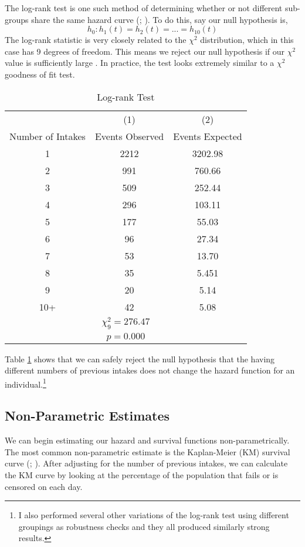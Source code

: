 \documentclass{article}
\begin{document}
The log-rank test is one such method of determining whether or not different sub-groups share the same hazard curve (\cite{mantel}; \cite{peto}). To do this, say our null hypothesis is,
\begin{equation}
    \label{eq3}
    h_0 : h_1 (t) = h_2 (t) = ... = h_{10} (t)
\end{equation}
The log-rank statistic is very closely related to the $\chi ^2$ distribution, which in this case has 9 degrees of freedom. This means we reject our null hypothesis if our $\chi ^2$ value is sufficiently large \parencite{lamorte}. In practice, the test looks extremely similar to a $\chi ^2$ goodness of fit test. 
\begin{table}[t]
    \centering
\begin{tabular}{ccc} \hline
 & (1) & (2) \\
Number of Intakes & Events Observed  & Events Expected  \\ \hline

1 & 2212 & 3202.98 \\
2 & 991 &  760.66  \\
3 & 509 &  252.44 \\
4 &  296 & 103.11  \\
5 & 177 & 55.03 \\
6 & 96 & 27.34  \\
7 &  53&   13.70 \\
8 & 35 & 5.451 \\ 
9 & 20 & 5.14\\
10+ & 42 & 5.08\\ \hline
\multicolumn{5}{c}{$\chi ^2 _9 = 276.47$}\\
\multicolumn{5}{c}{$p = 0.000$}
\end{tabular}
    \caption{Log-rank Test}
    \label{tab2}
\end{table}
Table \ref{tab2} shows that we can safely reject the null hypothesis that the having different numbers of previous intakes does not change the hazard function for an individual.\footnote{I also performed several other variations of the log-rank test using different groupings as robustness checks and they all produced similarly strong results.} 

\subsection{Non-Parametric Estimates}
We can begin estimating our hazard and survival functions non-parametrically. The most common non-parametric estimate is the Kaplan-Meier (KM) survival curve (\cite{kaplan}; \cite{clark}). After adjusting for the number of previous intakes, we can calculate the KM curve by looking at the percentage of the population that fails or is censored on each day. 
\end{document}
